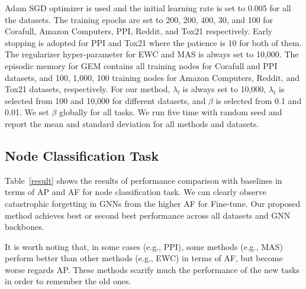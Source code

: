 \documentclass[letterpaper]{article} %
\begin{document}
Adam SGD optimizer is used and the initial learning rate
is set to 0.005 for all the datasets.
The training epochs are set to 200, 200, 400, 30, and 100 for Corafull, Amazon Computers, PPI, Reddit, and Tox21 respectively.
Early stopping is adopted for PPI and Tox21 where
the patience is 10 for both of them.
The regularizer hyper-parameter for EWC and MAS is always set to 10,000. %
The episodic memory for GEM contains all training nodes for Corafull and PPI datasets, and 100, 1,000, 100 training nodes for Amazon Computers, Reddit, and Tox21 datasets, respectively.
For our method, $\lambda_l$ is always set to 10,000, $\lambda_t$ is selected from 100 and 10,000 for different datasets, and $\beta$ is selected from 0.1 and 0.01.
We set $\beta$ globally for all tasks.
We run five time with random seed and report the mean
and standard deviation for all methods and datasets.


\subsection{Node Classification Task}
Table~\ref{result} shows the results of performance comparison with baselines in terms of AP and AF for node classification task.
We can clearly observe catastrophic forgetting in GNNs from the higher AF for Fine-tune.
Our proposed method achieves best or second best performance across all datasets and GNN backbones.

It is worth noting that, in some cases (e.g., PPI), some methods (e.g., MAS) perform better than other methods (e.g., EWC) in terms of AF, but become worse regards AP.
These methods scarify much the performance
of the new tasks in order to remember the old ones.
\end{document}

